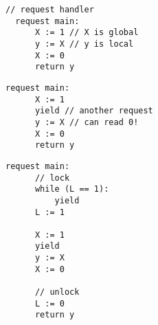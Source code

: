 \noindent
\begin{minipage}[t]{0.55\textwidth}
	\begin{minipage}[t]{\textwidth}
		\begin{lstlisting}[caption={Without yielding (serializable)},
			label={lst:MotivatingExample1Ser}]
  // request handler           
  request main: 
      X := 1 // X is global
      y := X // y is local
      X := 0
      return y 
		\end{lstlisting}
	\end{minipage}
	\vspace{1em}
	\begin{minipage}[t]{\textwidth}
		\begin{lstlisting}[caption={With yielding (not serializable)},
			label={lst:MotivatingExample2NonSer}]
  request main: 
      X := 1 
      yield // another request
      y := X // can read 0!
      X := 0
      return y 	
		\end{lstlisting}
	\end{minipage}
\end{minipage}%
\hfill
\begin{minipage}[t]{0.35\textwidth}
	\begin{lstlisting}[caption={With yielding and a spin-lock (serializable)},
		label={lst:MotivatingExample3Ser}]
  request main: 
      // lock
      while (L == 1): 
          yield
      L := 1 

      X := 1
      yield
      y := X 
      X := 0

      // unlock    
      L := 0
      return y 
	\end{lstlisting}
\end{minipage}

